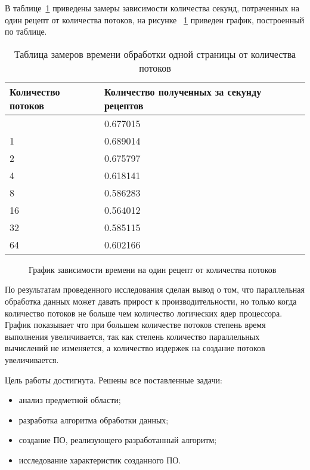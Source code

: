 В таблице~\ref{tbl:b_log} приведены замеры зависимости количества секунд, потраченных на один рецепт от количества потоков, на рисунке ~\ref{fig:time} приведен график, построенный по таблице.

\begin{longtable}{|p{}|p{}|p{}|}
    \caption{Таблица замеров времени обработки одной страницы от количества потоков}\label{tbl:b_log}
    \\
    \hline
    Количество потоков & Количество полученных за секунду рецептов\\
    \hline

    \hline
    \endhead
    \hline
    \endfoot
    \endlastfoot
    \hline
    0  & 0.677015 \\ \hline
    1 &0.689014 \\ \hline
    2 &0.675797 \\ \hline
    4 &0.618141 \\ \hline
    8 &0.586283 \\ \hline
    16 &0.564012 \\ \hline
    32 &0.585115 \\ \hline
    64 &0.602166 \\ \hline
\end{longtable}

\begin{figure}[h]
 \centering
 
 \caption{График зависимости времени на один рецепт от количества потоков}
 \label{fig:time}
\end{figure}
\newpage

По результатам проведенного исследования сделан вывод о том, что параллельная обработка данных может давать прирост к производительности, но только когда количество потоков не больше чем количество логических ядер процессора. График показывает что при большем количестве потоков степень время выполнения увеличивается, так как степень количество параллельных вычислений не изменяется, а количество издержек на создание потоков увеличивается.


Цель работы достигнута. Решены все поставленные задачи:
\begin{itemize}
    \item анализ предметной области;
    \item разработка алгоритма обработки данных;
    \item создание ПО, реализующего разработанный алгоритм;
    \item исследование характеристик созданного ПО.
\end{itemize}
